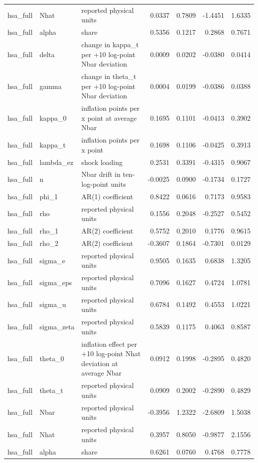 \begin{tabular}{lllrrrr}
hsa\_full & Nhat & reported physical units & 0.0337 & 0.7809 & -1.4451 & 1.6335 \\
hsa\_full & alpha & share & 0.5356 & 0.1217 & 0.2868 & 0.7671 \\
hsa\_full & delta & change in kappa\_t per +10 log-point Nbar deviation & 0.0009 & 0.0202 & -0.0380 & 0.0414 \\
hsa\_full & gamma & change in theta\_t per +10 log-point Nbar deviation & 0.0004 & 0.0199 & -0.0386 & 0.0388 \\
hsa\_full & kappa\_0 & inflation points per x point at average Nbar & 0.1695 & 0.1101 & -0.0413 & 0.3902 \\
hsa\_full & kappa\_t & inflation points per x point & 0.1698 & 0.1106 & -0.0425 & 0.3913 \\
hsa\_full & lambda\_ez & shock loading & 0.2531 & 0.3391 & -0.4315 & 0.9067 \\
hsa\_full & n & Nbar drift in ten-log-point units & -0.0025 & 0.0900 & -0.1734 & 0.1727 \\
hsa\_full & phi\_1 & AR(1) coefficient & 0.8422 & 0.0616 & 0.7173 & 0.9583 \\
hsa\_full & rho & reported physical units & 0.1556 & 0.2048 & -0.2527 & 0.5452 \\
hsa\_full & rho\_1 & AR(2) coefficient & 0.5752 & 0.2010 & 0.1776 & 0.9615 \\
hsa\_full & rho\_2 & AR(2) coefficient & -0.3607 & 0.1864 & -0.7301 & 0.0129 \\
hsa\_full & sigma\_e & reported physical units & 0.9505 & 0.1635 & 0.6838 & 1.3205 \\
hsa\_full & sigma\_eps & reported physical units & 0.7096 & 0.1627 & 0.4724 & 1.0781 \\
hsa\_full & sigma\_u & reported physical units & 0.6784 & 0.1492 & 0.4553 & 1.0221 \\
hsa\_full & sigma\_zeta & reported physical units & 0.5839 & 0.1175 & 0.4063 & 0.8587 \\
hsa\_full & theta\_0 & inflation effect per +10 log-point Nhat deviation at average Nbar & 0.0912 & 0.1998 & -0.2895 & 0.4820 \\
hsa\_full & theta\_t & reported physical units & 0.0909 & 0.2002 & -0.2890 & 0.4829 \\
hsa\_full & Nbar & reported physical units & -0.3956 & 1.2322 & -2.6809 & 1.5038 \\
hsa\_full & Nhat & reported physical units & 0.3957 & 0.8050 & -0.9877 & 2.1556 \\
hsa\_full & alpha & share & 0.6261 & 0.0760 & 0.4768 & 0.7778 \\

\end{tabular}

